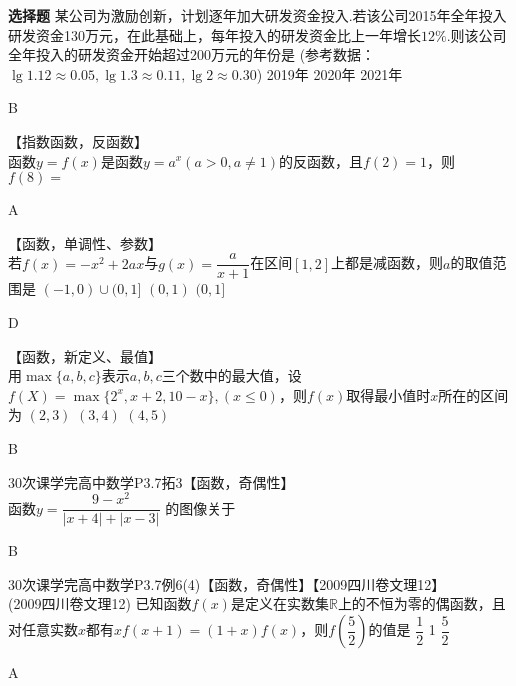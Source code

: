 \begin{exercise}{\bf 选择题}
      某公司为激励创新，计划逐年加大研发资金投入.若该公司2015年全年投入研发资金130万元，在此基础上，每年投入的研发资金比上一年增长$12\%$.则该公司全年投入的研发资金开始超过200万元的年份是
      (参考数据：$\lg1.12\approx0.05,\lg1.3\approx0.11,\lg2\approx0.30$)\xz
        {2019年}
        {2020年}
        {2021年}
      \begin{answer}
        B
      \end{answer}
    \item 【指数函数，反函数】\\
      函数$y=f(x)$是函数$y=a^x(a>0,a\neq1)$的反函数，且$f(2)=1$，则$f(8)=$\xz
      \begin{answer}
        A
      \end{answer}
    \item 【函数，单调性、参数】\\
      若$f(x)=-x^2+2ax$与$g(x)=\dfrac{a}{x+1}$在区间$[1,2]$上都是减函数，则$a$的取值范围是\xz
        {$(-1,0)\cup (0,1]$}
        {$(0,1)$}
        {$(0,1]$}
      \begin{answer}
        D
      \end{answer}
    \item 【函数，新定义、最值】\\
      用$\max\{a,b,c\}$表示$a,b,c$三个数中的最大值，设$f(X)=\max\{2^x,x+2,10-x\},(x\leq 0)$，则$f(x)$取得最小值时$x$所在的区间为\xz
        {$(2,3)$}
        {$(3,4)$}
        {$(4,5)$}
      \begin{answer}
        B
      \end{answer}
    \item 30次课学完高中数学P3.7拓3【函数，奇偶性】\\
      函数$y=\dfrac{9-x^2}{|x+4|+|x-3|}$ 的图像关于\xz
      \begin{answer}
        B
      \end{answer}
    \item 30次课学完高中数学P3.7例6(4)【函数，奇偶性】【2009四川卷文理12】\\
      (2009四川卷文理12) 已知函数$f(x)$是定义在实数集$\mathbb{R}$上的不恒为零的偶函数，且对任意实数$x$都有$xf(x+1)=(1+x)f(x) $，则$f(\dfrac{5}{2}) $的值是\xz
       {$\dfrac12$}
       {1}
       {$\dfrac52$}
      \begin{answer}
        A
      \end{answer}

\end{exercise}

